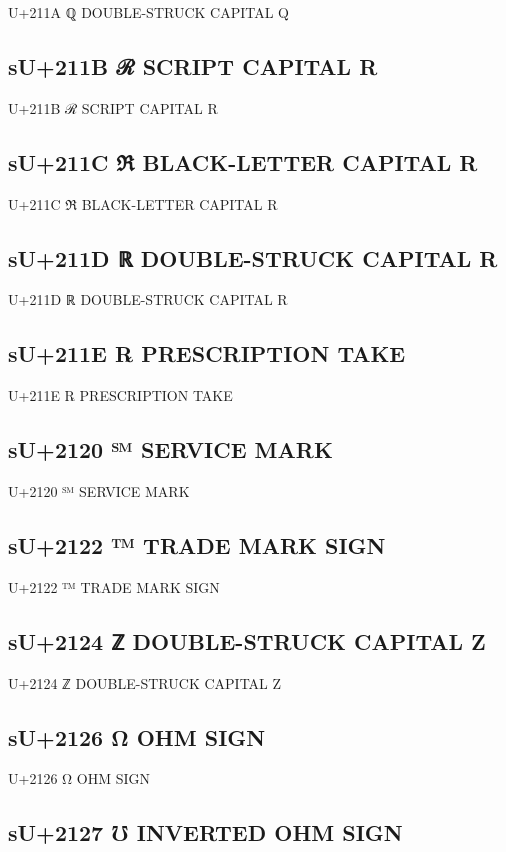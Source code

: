 U+211A ℚ DOUBLE-STRUCK CAPITAL Q

\subsection{sU+211B ℛ SCRIPT CAPITAL R}

U+211B ℛ SCRIPT CAPITAL R

\subsection{sU+211C ℜ BLACK-LETTER CAPITAL R}

U+211C ℜ BLACK-LETTER CAPITAL R

\subsection{sU+211D ℝ DOUBLE-STRUCK CAPITAL R}

U+211D ℝ DOUBLE-STRUCK CAPITAL R

\subsection{sU+211E ℞  PRESCRIPTION TAKE}

U+211E ℞  PRESCRIPTION TAKE

\subsection{sU+2120 ℠  SERVICE MARK}

U+2120 ℠  SERVICE MARK

\subsection{sU+2122 ™  TRADE MARK SIGN}

U+2122 ™  TRADE MARK SIGN

\subsection{sU+2124 ℤ DOUBLE-STRUCK CAPITAL Z}

U+2124 ℤ DOUBLE-STRUCK CAPITAL Z

\subsection{sU+2126 Ω  OHM SIGN}

U+2126 Ω  OHM SIGN

\subsection{sU+2127 ℧  INVERTED OHM SIGN}


